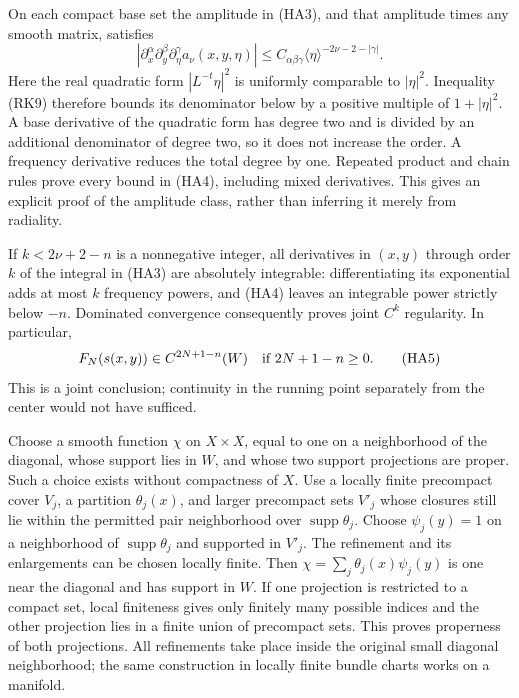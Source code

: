 \documentclass[
  11pt,
]{article}
\begin{document}
On each compact base set the amplitude in (HA3), and that amplitude
times any smooth matrix, satisfies \[
 |\partial_x^\alpha\partial_y^\beta\partial_\eta^\gamma
                         a_\nu(x,y,\eta)|
       \leq C_{\alpha\beta\gamma}\langle\eta\rangle^{-2\nu-2-|\gamma|}.
                                                               \tag{HA4}
\] Here the real quadratic form \(|L^{-t}\eta|^2\) is uniformly
comparable to \(|\eta|^2\). Inequality (RK9) therefore bounds its
denominator below by a positive multiple of \(1+|\eta|^2\). A base
derivative of the quadratic form has degree two and is divided by an
additional denominator of degree two, so it does not increase the order.
A frequency derivative reduces the total degree by one. Repeated product
and chain rules prove every bound in (HA4), including mixed derivatives.
This gives an explicit proof of the amplitude class, rather than
inferring it merely from radiality.

If \(k<2\nu+2-n\) is a nonnegative integer, all derivatives in \((x,y)\)
through order \(k\) of the integral in (HA3) are absolutely integrable:
differentiating its exponential adds at most \(k\) frequency powers, and
(HA4) leaves an integrable power strictly below \(-n\). Dominated
convergence consequently proves joint \(C^k\) regularity. In particular,
\[
               F_N(s(x,y))\in C^{2N+1-n}(W)
                   \quad\hbox{if }2N+1-n\geq0.                \tag{HA5}
\] This is a joint conclusion; continuity in the running point
separately from the center would not have sufficed.

Choose a smooth function \(\chi\) on \(X\times X\), equal to one on a
neighborhood of the diagonal, whose support lies in \(W\), and whose two
support projections are proper. Such a choice exists without compactness
of \(X\). Use a locally finite precompact cover \(V_j\), a partition
\(\theta_j(x)\), and larger precompact sets \(V'_j\) whose closures
still lie within the permitted pair neighborhood over
\(\operatorname{supp}\theta_j\). Choose \(\psi_j(y)=1\) on a
neighborhood of \(\operatorname{supp}\theta_j\) and supported in
\(V'_j\). The refinement and its enlargements can be chosen locally
finite. Then \(\chi=\sum_j\theta_j(x)\psi_j(y)\) is one near the
diagonal and has support in \(W\). If one projection is restricted to a
compact set, local finiteness gives only finitely many possible indices
and the other projection lies in a finite union of precompact sets. This
proves properness of both projections. All refinements take place inside
the original small diagonal neighborhood; the same construction in
locally finite bundle charts works on a manifold.
\end{document}

